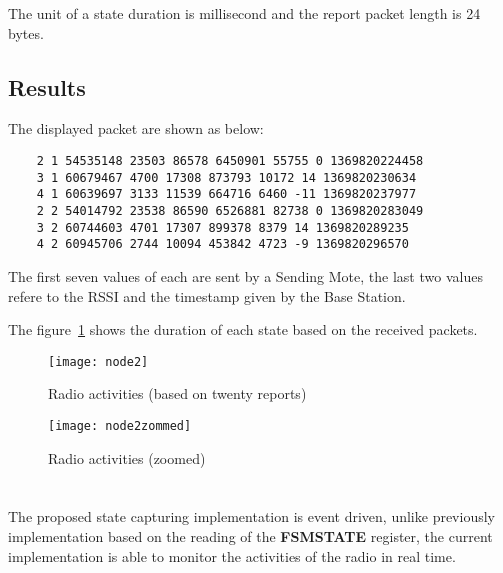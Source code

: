 \documentclass[a4paper,11pt]{article}
\begin{document}
The unit of a state duration is millisecond and the report packet length is 24 bytes.

  \subsection{Results}

The displayed packet are shown as below:

  \begin{verbatim}
    2 1 54535148 23503 86578 6450901 55755 0 1369820224458
    3 1 60679467 4700 17308 873793 10172 14 1369820230634
    4 1 60639697 3133 11539 664716 6460 -11 1369820237977
    2 2 54014792 23538 86590 6526881 82738 0 1369820283049
    3 2 60744603 4701 17307 899378 8379 14 1369820289235
    4 2 60945706 2744 10094 453842 4723 -9 1369820296570
  \end{verbatim}

The first seven values of each are sent by a Sending Mote, the last two values refere to the RSSI and the timestamp given by the Base Station.

The figure~\ref{fig:histogram} shows the duration of each state based on the received packets.

  \begin{figure}[h]
    \centering
    \texttt{[image: node2]}
    \caption{Radio activities (based on twenty reports)}
    \label{fig:histogram}
  \end{figure}

  \begin{figure}
    \centering
    \texttt{[image: node2zommed]}
    \caption{Radio activities (zoomed)}
    \label{fig:histogram2}
  \end{figure}

\section{}

The proposed state capturing implementation is event driven, unlike previously implementation based on the reading of the \textbf{FSMSTATE} register, the current implementation is able to monitor the activities of the radio in real time.

\newpage

\section*{}
\end{document}
